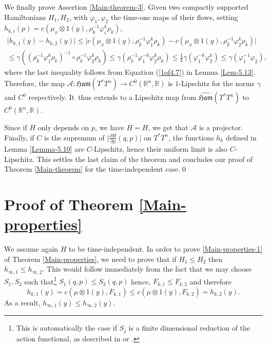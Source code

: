 \documentclass[JEP,XML,SOM,NoFloatCountersInSection,Unicode,published]{cedram}
\numberwithin{equation}{section}
\newcommand {\Ham}{{\mathfrak {Ham}}}
\let \phi \varphi
\theoremstyle{plain}
\theoremstyle{definition}
\theoremstyle{remark}
\begin{document}
We finally prove Assertion \eqref{Main-theorem-3}. Given two compactly supported Hamiltonians $H_1, H_2$, with $\varphi_1,\varphi_2$ the time-one maps of their flows, setting $h_{k,i}(p)=c(\mu_{x}\otimes 1 (y), \rho_{k}^{-1}\phi_{i}^{k}\rho_{k})$,
\begin{multline*}
\vert { h}_{k,1}(y) - { h}_{k,2}(y) \vert \leq \vert c(\mu_{x}\otimes 1 (y), \rho_{k}^{-1}\phi_{1}^{k}\rho_{k})-c(\mu_{x}\otimes 1(y), \rho_{k}^{-1}\phi_{2}^{k}\rho_{k}) \vert\\
\leq \gamma \left ((\rho_{k}^{-1}\phi_{1}^{k}\rho_{k})^{-1} \circ \rho_{k}^{-1}\phi_{2}^{k}\rho_{k} \right) \leq \gamma (\rho_{k}^{-1}\phi_{1}^{-k}\phi_{2}^{k}\rho_{k}) \leq \frac{1}{k} \gamma (\phi_{1}^{-k}\phi_{2}^{k}) \leq \gamma (\phi_{1}^{-1}\phi_{2}),
\end{multline*}
where the last inequality follows from Equation (\ref{1of4.7}) in Lemma \ref{Lem-5.13}.
Therefore, the map $\mathcal A: \Ham(T^*T^n) \to C^0({\mathbb R}^n, {\mathbb R})$ is $1$-Lipschitz for the norms $\gamma$ and $C^0$ respectively. It~thus extends to a Lipschitz map from $\widehat \Ham(T^*T^n)$ to $C^{0}({\mathbb R}^{n}, {\mathbb R})$.

Since if $H$ only depends on $p$, we have $\overline H=H$, we get that $\mathcal A$ is a projector.
Finally, if $C$ is the supremum of $ \bigl\vert \frac{\partial H }{\partial p}(q,p)\bigr\vert$ on $T^*T^n$, the functions $h_k$ defined in Lemma \ref{Lemma-5.10} are $C$-Lipschitz, hence their uniform limit is also $C$-Lipschitz.
This settles the last claim of the theorem and concludes our proof of Theorem \ref{Main-theorem} for the time-independent case.\qed

\section{Proof of Theorem \ref{Main-properties}}\label{sec:pfmain}
We assume again $H$ to be time-independent.
In order to prove \eqref{Main-properties-1} of Theorem \ref{Main-properties}, we need to prove that if $H_1 \leq H_2$ then ${ h}_{\infty,1} \leq { h}_{\infty,2}$. This would follow immediately from the fact that we may choose $S_{1}, S_{2}$ such that\footnote{This is automatically the case if $S_{j}$ is a finite dimensional reduction of the action functional, as described in \cite{Chaperon2} or \cite{Laudenbach-Sikorav}.} $S_{1}(q,p) \leq S_{2}(q,p)$ hence, ${F}_{k,1}\leq {F}_{k,2}$ and therefore
\[
{ h}_{k,1}(y)=c(\mu\otimes 1(y), {F}_{k,1}) \leq c(\mu\otimes 1(y), {F}_{k,2})={ h}_{k,2}(y).
\]
As a result, ${ h}_{\infty,1}(y)\leq { h}_{\infty,2}(y)$.
\end{document}
